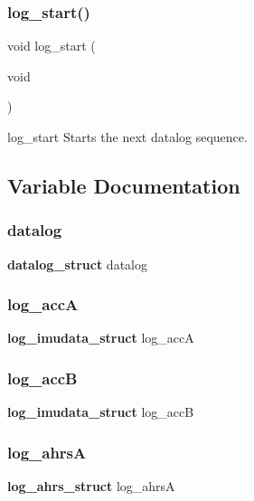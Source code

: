 \subsubsection{log\+\_\+start()}
{\footnotesize\ttfamily void log\+\_\+start (\begin{DoxyParamCaption}\item[{void}]{ }\end{DoxyParamCaption})}

log\+\_\+start Starts the next datalog sequence. 

\subsection{Variable Documentation}
\mbox{\label{log_8h_aa23e9ffda0c1382ab8c56d162ff41469}} 
\subsubsection{datalog}
{\footnotesize\ttfamily \textbf{ datalog\+\_\+struct} datalog}

\mbox{\label{log_8h_afe898df24cc6677d8a5a8ab50053a89c}} 
\subsubsection{log\+\_\+accA}
{\footnotesize\ttfamily \textbf{ log\+\_\+imudata\+\_\+struct} log\+\_\+accA}

\mbox{\label{log_8h_a19ec98cf8734ae32b63ae39ed3993237}} 
\subsubsection{log\+\_\+accB}
{\footnotesize\ttfamily \textbf{ log\+\_\+imudata\+\_\+struct} log\+\_\+accB}

\mbox{\label{log_8h_a86bcde26e1126f3fc6a0dcdc00efacfb}} 
\subsubsection{log\+\_\+ahrsA}
{\footnotesize\ttfamily \textbf{ log\+\_\+ahrs\+\_\+struct} log\+\_\+ahrsA}

